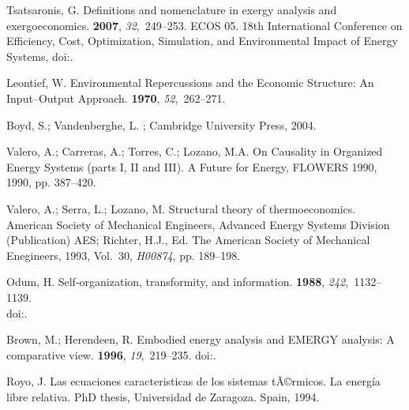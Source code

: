 \documentclass[energies,article,submit,moreauthors,pdftex]{Definitions/mdpi}
\begin{document}
\begin{thebibliography}{-------}
	Tsatsaronis, G.
	\newblock Definitions and nomenclature in exergy analysis and exergoeconomics.
	 {\bf 2007}, {\em 32},~249--253.
	\newblock ECOS 05. 18th International Conference on Efficiency, Cost,
	Optimization, Simulation, and Environmental Impact of Energy Systems,
	doi:{\href{https://doi.org/https://doi.org/10.1016/j.energy.2006.07.002}{}}.

	Leontief, W.
	\newblock Environmental {R}epercussions and the {E}conomic {S}tructure: {A}n
	{I}nput--{O}utput {A}pproach.
	 {\bf 1970}, {\em
		52},~262--271.

	Boyd, S.; Vandenberghe, L.
	; Cambridge University Press,  2004.

	Valero, A.; Carreras, A.; Torres, C.; Lozano, M.A.
	\newblock On {C}ausality in {O}rganized {E}nergy {S}ystems (parts {I}, {II} and
	{III}).
	\newblock  A Future for Energy, FLOWERS 1990,  1990, pp. 387--420.

	Valero, A.; Serra, L.; Lozano, M.
	\newblock Structural theory of thermoeconomics.
	\newblock  American Society of Mechanical Engineers, Advanced Energy Systems
	Division (Publication) AES; Richter, H.J., Ed. The American Society of
	Mechanical Enegineers,  1993, Vol.~30, {\em H00874}, pp. 189--198.

	Odum, H.
	\newblock Self-organization, transformity, and information.
	 {\bf 1988}, {\em 242},~1132--1139.\\
	\newblock
	doi:{\href{https://doi.org/10.1126/science.242.4882.1132}{}}.

	Brown, M.; Herendeen, R.
	\newblock Embodied energy analysis and EMERGY analysis: A comparative view.
	 {\bf 1996}, {\em 19},~219--235.
	\newblock
	doi:{\href{https://doi.org/10.1016/S0921-8009(96)00046-8}{}}.

	Royo, J.
	\newblock Las ecuaciones caracteristicas de los sistemas tÃ©rmicos. {L}a
	energía libre relativa.
	\newblock PhD thesis, Universidad de Zaragoza. Spain,  1994.


\end{thebibliography}
\end{document}
